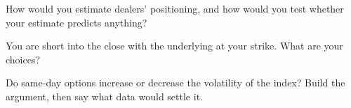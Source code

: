 \begin{interviewq}\label{iq:m1:zero-day-options-and-retail-flow:4}
How would you estimate dealers'  positioning, and how would you test
whether your estimate predicts anything?
\end{interviewq}

\begin{interviewq}\label{iq:m1:zero-day-options-and-retail-flow:5}
You are short  into the close with the underlying at your strike. What
are your choices?
\end{interviewq}

\begin{interviewq}\label{iq:m1:zero-day-options-and-retail-flow:6}
Do same-day options increase or decrease the volatility of the index? Build
the argument, then say what data would settle it.
\end{interviewq}
